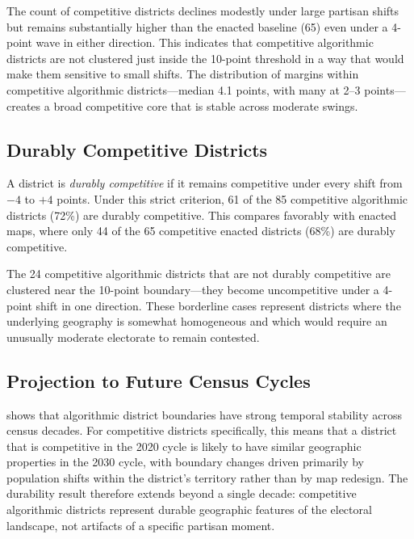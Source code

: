 The count of competitive districts declines modestly under large partisan
shifts but remains substantially higher than the enacted baseline (65) even
under a 4-point wave in either direction.  This indicates that competitive
algorithmic districts are not clustered just inside the 10-point threshold
in a way that would make them sensitive to small shifts.  The distribution
of margins within competitive algorithmic districts---median 4.1 points, with
many at 2--3 points---creates a broad competitive core that is stable across
moderate swings.

\subsection{Durably Competitive Districts}

A district is \emph{durably competitive} if it remains competitive under
every shift from $-4$ to $+4$ points.  Under this strict criterion, 61 of
the 85 competitive algorithmic districts (72\%) are durably competitive.
This compares favorably with enacted maps, where only 44 of the 65 competitive
enacted districts (68\%) are durably competitive.

The 24 competitive algorithmic districts that are not durably competitive
are clustered near the 10-point boundary---they become uncompetitive under a
4-point shift in one direction.  These borderline cases represent districts
where the underlying geography is somewhat homogeneous and which would require
an unusually moderate electorate to remain contested.

\subsection{Projection to Future Census Cycles}

\citet{dellaLibera2026stability} shows that algorithmic district boundaries
have strong temporal stability across census decades.  For competitive
districts specifically, this means that a district that is competitive in the
2020 cycle is likely to have similar geographic properties in the 2030 cycle,
with boundary changes driven primarily by population shifts within the
district's territory rather than by map redesign.  The durability result
therefore extends beyond a single decade: competitive algorithmic districts
represent durable geographic features of the electoral landscape, not
artifacts of a specific partisan moment.
